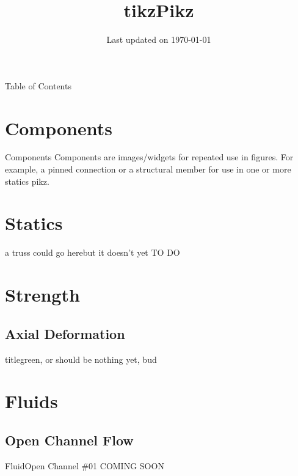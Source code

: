 \documentclass[9pt,xcolor={svgnames, x11names}]{beamer}
\title[\color{black}TikzPikz]{\Huge tikzPikz}
\subtitle{} %
\institute{\small Source code at: \lb{\footnotesize\url{https://github.com/dmorgorg/tikzPikz}}}
\author{} %
\date{\small Last updated on \today}
\begin{document}
    \begin{frame}
        \titlepage 
    \end{frame}
    \begin{frame}{Table of Contents}
        \tableofcontents
    \end{frame}

    \section{Components}

    \begin{frame}{Components}
        Components are images/widgets for repeated use in figures. \parb 
        For example, a pinned connection or a structural member for use in one or more statics pikz.
    \end{frame}

    \section{Statics}

    \begin{frame}{a truss could go here}{but it doesn't yet}
        TO DO
    \end{frame}

    \section{Strength}
    \subsection{Axial Deformation}

    \begin{frame}{title}{green, or should be}
        nothing yet, bud
    \end{frame}

    \section{Fluids}
    \subsection{Open Channel Flow}

    \begin{frame}{Fluid}{Open Channel \#01}
        COMING SOON
    \end{frame}
    
\end{document}
